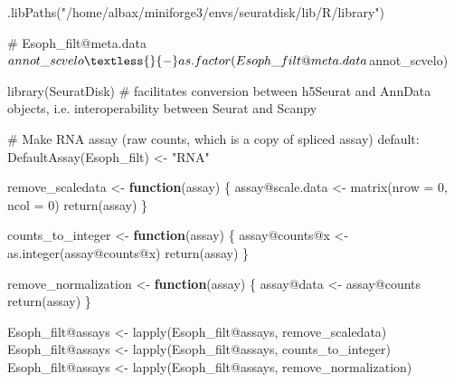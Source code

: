 \documentclass[
  letterpaper,
  DIV=11,
  numbers=noendperiod]{scrreprt}
\newenvironment{Shaded}{\begin{snugshade}}{\end{snugshade}}
\newcommand{\AttributeTok}[1]{\textcolor[rgb]{0.40,0.45,0.13}{#1}}
\newcommand{\CommentTok}[1]{\textcolor[rgb]{0.37,0.37,0.37}{#1}}
\newcommand{\ControlFlowTok}[1]{\textcolor[rgb]{0.00,0.23,0.31}{\textbf{#1}}}
\newcommand{\DecValTok}[1]{\textcolor[rgb]{0.68,0.00,0.00}{#1}}
\newcommand{\FunctionTok}[1]{\textcolor[rgb]{0.28,0.35,0.67}{#1}}
\newcommand{\NormalTok}[1]{\textcolor[rgb]{0.00,0.23,0.31}{#1}}
\newcommand{\OtherTok}[1]{\textcolor[rgb]{0.00,0.23,0.31}{#1}}
\newcommand{\SpecialCharTok}[1]{\textcolor[rgb]{0.37,0.37,0.37}{#1}}
\newcommand{\StringTok}[1]{\textcolor[rgb]{0.13,0.47,0.30}{#1}}
\begin{document}
\begin{Shaded}
\begin{Highlighting}[]
\FunctionTok{.libPaths}\NormalTok{(}\StringTok{"/home/albax/miniforge3/envs/seuratdisk/lib/R/library"}\NormalTok{)}

\CommentTok{\# Esoph\_filt@meta.data$annot\_scvelo \textless{}{-} as.factor(Esoph\_filt@meta.data$annot\_scvelo)}

\FunctionTok{library}\NormalTok{(SeuratDisk) }\CommentTok{\# facilitates conversion between h5Seurat and AnnData objects, i.e. interoperability between Seurat and Scanpy}

\CommentTok{\# Make RNA assay (raw counts, which is a copy of spliced assay) default:}
\FunctionTok{DefaultAssay}\NormalTok{(Esoph\_filt) }\OtherTok{\textless{}{-}} \StringTok{"RNA"}

\NormalTok{remove\_scaledata }\OtherTok{\textless{}{-}} \ControlFlowTok{function}\NormalTok{(assay) \{}
\NormalTok{    assay}\SpecialCharTok{@}\NormalTok{scale.data }\OtherTok{\textless{}{-}} \FunctionTok{matrix}\NormalTok{(}\AttributeTok{nrow =} \DecValTok{0}\NormalTok{, }\AttributeTok{ncol =} \DecValTok{0}\NormalTok{)}
    \FunctionTok{return}\NormalTok{(assay)}
\NormalTok{\}}

\NormalTok{counts\_to\_integer }\OtherTok{\textless{}{-}} \ControlFlowTok{function}\NormalTok{(assay) \{}
\NormalTok{    assay}\SpecialCharTok{@}\NormalTok{counts}\SpecialCharTok{@}\NormalTok{x }\OtherTok{\textless{}{-}} \FunctionTok{as.integer}\NormalTok{(assay}\SpecialCharTok{@}\NormalTok{counts}\SpecialCharTok{@}\NormalTok{x)}
    \FunctionTok{return}\NormalTok{(assay)}
\NormalTok{\}}

\NormalTok{remove\_normalization }\OtherTok{\textless{}{-}} \ControlFlowTok{function}\NormalTok{(assay) \{}
\NormalTok{    assay}\SpecialCharTok{@}\NormalTok{data }\OtherTok{\textless{}{-}}\NormalTok{ assay}\SpecialCharTok{@}\NormalTok{counts}
    \FunctionTok{return}\NormalTok{(assay)}
\NormalTok{\}}

\NormalTok{Esoph\_filt}\SpecialCharTok{@}\NormalTok{assays }\OtherTok{\textless{}{-}} \FunctionTok{lapply}\NormalTok{(Esoph\_filt}\SpecialCharTok{@}\NormalTok{assays, remove\_scaledata)}
\NormalTok{Esoph\_filt}\SpecialCharTok{@}\NormalTok{assays }\OtherTok{\textless{}{-}} \FunctionTok{lapply}\NormalTok{(Esoph\_filt}\SpecialCharTok{@}\NormalTok{assays, counts\_to\_integer)}
\NormalTok{Esoph\_filt}\SpecialCharTok{@}\NormalTok{assays }\OtherTok{\textless{}{-}} \FunctionTok{lapply}\NormalTok{(Esoph\_filt}\SpecialCharTok{@}\NormalTok{assays, remove\_normalization)}


\end{Highlighting}
\end{Shaded}
\end{document}
